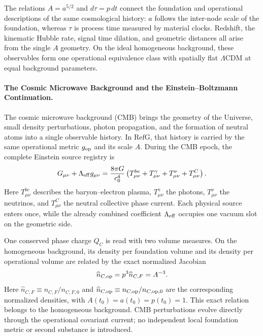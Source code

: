 \documentclass[11pt,a4paper]{article}
\newcommand{\RefG}{\mathrm{RefG}}
\begin{document}
The relations $A=a^{5/2}$ and $d\tau=p\,dt$ connect the foundation and operational descriptions of the same cosmological history: $a$ follows the inter-node scale of the foundation, whereas $\tau$ is process time measured by material clocks. Redshift, the kinematic Hubble rate, signal time dilation, and geometric distances all arise from the single $A$ geometry. On the ideal homogeneous background, these observables form one operational equivalence class with spatially flat $\Lambda$CDM at equal background parameters.

\paragraph{The Cosmic Microwave Background and the Einstein--Boltzmann Continuation.}

The cosmic microwave background (CMB) brings the geometry of the Universe, small density perturbations, photon propagation, and the formation of neutral atoms into a single observable history. In $\RefG$, that history is carried by the same operational metric $g_{\rm op}$ and its scale $A$. During the CMB epoch, the complete Einstein source registry is
\begin{equation}
G_{\mu\nu}+\Lambda_{\rm eff}g_{\mu\nu}
=\frac{8\pi G}{c_0^4}
\left(T^{be}_{\mu\nu}+T^\gamma_{\mu\nu}+T^\nu_{\mu\nu}+T^C_{\mu\nu}\right).
\end{equation}
Here $T^{be}_{\mu\nu}$ describes the baryon--electron plasma, $T^\gamma_{\mu\nu}$ the photons, $T^\nu_{\mu\nu}$ the neutrinos, and $T^C_{\mu\nu}$ the neutral collective phase current. Each physical source enters once, while the already combined coefficient $\Lambda_{\rm eff}$ occupies one vacuum slot on the geometric side.

One conserved phase charge $Q_C$ is read with two volume measures. On the homogeneous background, its density per foundation volume and its density per operational volume are related by the exact normalized Jacobian
\begin{equation}
\widehat n_{C,{\rm op}}=p^3\widehat n_{C,F}=A^{-3}.
\end{equation}
Here $\widehat n_{C,F}\equiv n_{C,F}/n_{C,F,0}$ and $\widehat n_{C,{\rm op}}\equiv n_{C,{\rm op}}/n_{C,{\rm op},0}$ are the corresponding normalized densities, with $A(t_0)=a(t_0)=p(t_0)=1$. This exact relation belongs to the homogeneous background. CMB perturbations evolve directly through the operational covariant current; no independent local foundation metric or second substance is introduced.
\end{document}
